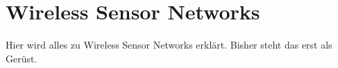 \section{Wireless Sensor Networks}\label{s:WirelessSensorNetworks}

Hier wird alles zu Wireless Sensor Networks erklärt. Bisher steht das erst als Gerüst.



